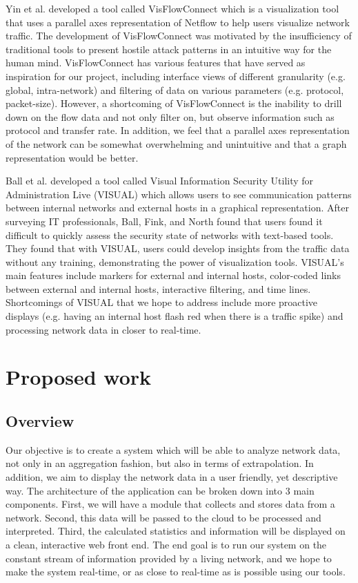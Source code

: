 \documentclass{sig-alternate}
\begin{document}
Yin et al.\cite{Yin04} developed a tool called VisFlowConnect which is a
visualization tool that uses a parallel axes representation of Netflow to help
users visualize network traffic. The development of VisFlowConnect was motivated
by the insufficiency of traditional tools to present hostile attack patterns in
an intuitive way for the human mind. VisFlowConnect has various features that
have served as inspiration for our project, including interface views of
different granularity (e.g. global, intra-network) and filtering of data on
various parameters (e.g. protocol, packet-size). However, a shortcoming of
VisFlowConnect is the inability to drill down on the flow data and not only
filter on, but observe information such as protocol and transfer rate. In
addition, we feel that a parallel axes representation of the network can be
somewhat overwhelming and unintuitive and that a graph representation would be
better.

Ball et al.\cite{Ball04} developed a tool called Visual Information Security
Utility for Administration Live (VISUAL) which allows users to see communication
patterns between internal networks and external hosts in a graphical
representation. After surveying IT professionals, Ball, Fink, and North found
that users found it difficult to quickly assess the security state of networks
with text-based tools. They found that with VISUAL, users could develop insights
from the traffic data without any training, demonstrating the power of
visualization tools. VISUAL's main features include markers for external and
internal hosts, color-coded links between external and internal hosts,
interactive filtering, and time lines. Shortcomings of VISUAL that we hope to
address include more proactive displays (e.g. having an internal host flash red
when there is a traffic spike) and processing network data in closer to
real-time.

\section{Proposed work}

\subsection{Overview}

Our objective is to create a system which will be able to analyze network data,
not only in an aggregation fashion, but also in terms of extrapolation. In
addition, we aim to display the network data in a user friendly, yet descriptive
way. The architecture of the application can be broken down into 3 main
components. First, we will have a module that collects and stores data from a
network. Second, this data will be passed to the cloud to be processed and
interpreted. Third, the calculated statistics and information will be displayed
on a clean, interactive web front end. The end goal is to run our system on the
constant stream of information provided by a living network, and we hope to make
the system real-time, or as close to real-time as is possible using our tools.
\end{document}
